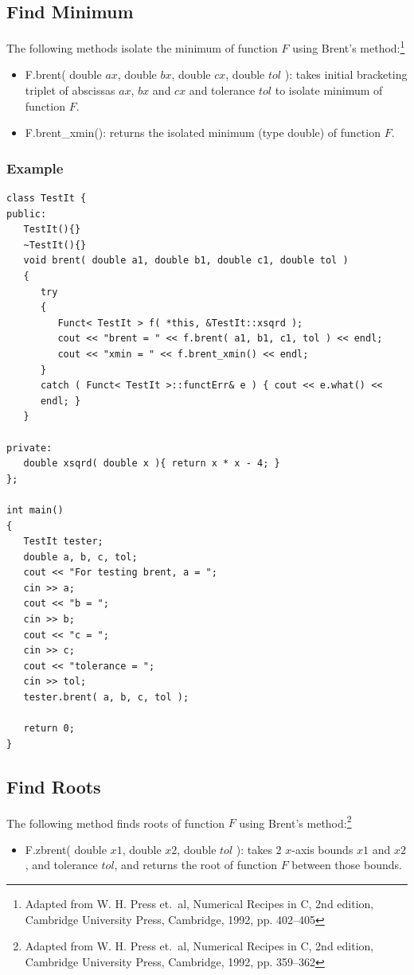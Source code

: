 \documentclass{report}
\begin{document}
\subsection{Find Minimum}

The following methods isolate the minimum of function $F$ using
Brent's method:\footnote{Adapted from W. H. Press et.\ al, Numerical
Recipes in C, 2nd edition, Cambridge University Press, Cambridge,
1992, pp. 402--405}
\begin{itemize}
\item F.brent( double $ax$, double $bx$, double $cx$, double $tol$ ):
takes initial bracketing triplet of abscissas $ax$, $bx$ and $cx$ and
tolerance $tol$ to isolate minimum of function $F$.
\item F.brent\_xmin(): returns the isolated minimum (type double) of
function $F$.
\end{itemize}

\subsubsection{Example}
\begin{verbatim}
class TestIt {
public:
   TestIt(){}
   ~TestIt(){}
   void brent( double a1, double b1, double c1, double tol )
   {
      try
      {
         Funct< TestIt > f( *this, &TestIt::xsqrd );
         cout << "brent = " << f.brent( a1, b1, c1, tol ) << endl;
         cout << "xmin = " << f.brent_xmin() << endl;
      }
      catch ( Funct< TestIt >::functErr& e ) { cout << e.what() <<
      endl; }
   }

private:
   double xsqrd( double x ){ return x * x - 4; }
};

int main()
{
   TestIt tester;
   double a, b, c, tol;
   cout << "For testing brent, a = ";
   cin >> a;
   cout << "b = ";
   cin >> b;
   cout << "c = ";
   cin >> c;
   cout << "tolerance = ";
   cin >> tol;
   tester.brent( a, b, c, tol );

   return 0;
}
\end{verbatim}

\subsection{Find Roots}

The following method finds roots of function $F$ using Brent's
method:\footnote{Adapted from W. H. Press et.\ al, Numerical Recipes
in C, 2nd edition, Cambridge University Press, Cambridge, 1992, pp.
359--362}
\begin{itemize}
\item F.zbrent( double $x1$, double $x2$, double $tol$ ): takes 2
$x$-axis bounds $x1$ and $x2$, and tolerance $tol$, and returns the
root of function $F$ between those bounds.
\end{itemize}
\end{document}
